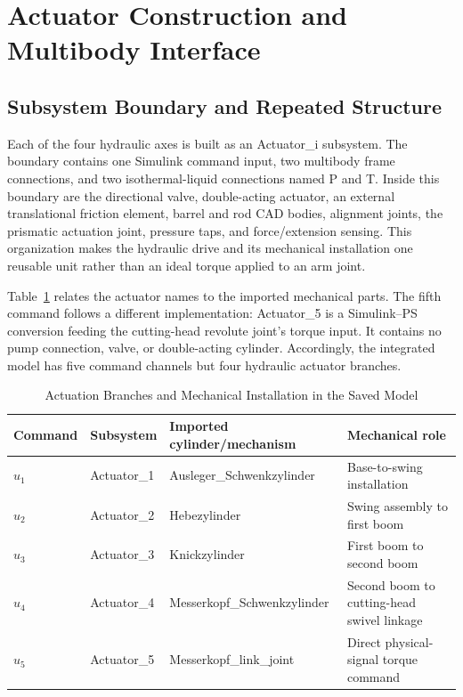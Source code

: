 \section{Actuator Construction and Multibody Interface}
\label{sec:construction}
\subsection{Subsystem Boundary and Repeated Structure}
Each of the four hydraulic axes is built as an \textnormal{Actuator\_i} subsystem. The boundary contains one Simulink command input, two multibody frame connections, and two isothermal-liquid connections named P and T. Inside this boundary are the directional valve, double-acting actuator, an external translational friction element, barrel and rod CAD bodies, alignment joints, the prismatic actuation joint, pressure taps, and force/extension sensing. This organization makes the hydraulic drive and its mechanical installation one reusable unit rather than an ideal torque applied to an arm joint.

Table~\ref{tab:branches} relates the actuator names to the imported mechanical parts. The fifth command follows a different implementation: \textnormal{Actuator\_5} is a Simulink--PS conversion feeding the cutting-head revolute joint's torque input. It contains no pump connection, valve, or double-acting cylinder. Accordingly, the integrated model has five command channels but four hydraulic actuator branches.

\begin{table}[t]
\caption{Actuation Branches and Mechanical Installation in the Saved Model}
\label{tab:branches}
\centering\small
\begin{tabular}{llll}
\hline
Command & Subsystem & Imported cylinder/mechanism & Mechanical role\\\hline
$u_1$ & Actuator\_1 & Ausleger\_Schwenkzylinder & Base-to-swing installation\\
$u_2$ & Actuator\_2 & Hebezylinder & Swing assembly to first boom\\
$u_3$ & Actuator\_3 & Knickzylinder & First boom to second boom\\
$u_4$ & Actuator\_4 & Messerkopf\_Schwenkzylinder & Second boom to cutting-head swivel linkage\\
$u_5$ & Actuator\_5 & Messerkopf\_link\_joint & Direct physical-signal torque command\\\hline
\end{tabular}
\end{table}

